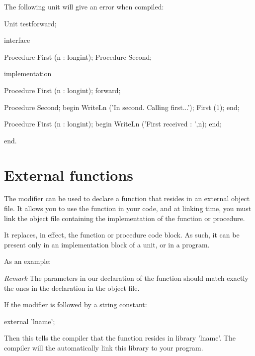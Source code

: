 \documentclass{report}
\begin{document}
The following unit will give an error when compiled:
\begin{listing}
Unit testforward;

interface

Procedure First (n : longint);
Procedure Second;

implementation

Procedure First (n : longint); forward;

Procedure Second;
begin
  WriteLn ('In second. Calling first...');
  First (1);
end;

Procedure First (n : longint);
begin
  WriteLn ('First received : ',n);
end;

end.
\end{listing}

\section{External functions}
\label{se:external}
The  modifier can be used to declare a function that resides in
an external object file. It allows you to use the function in
your code, and at linking time, you must link the object file containing the
implementation of the function or procedure.



It replaces, in effect, the function or procedure code block. As such, it
can be present only in an implementation block of a unit, or in a program. 

As an example:

{\em Remark} The parameters in our declaration of the  function 
should match exactly the ones in the declaration in the object file.

If the  modifier is followed by a string constant:
\begin{listing}
external 'lname';
\end{listing}
Then this tells the compiler that the function resides in library 
'lname'. The compiler will the automatically link this library to 
your program.
 
\end{document}
